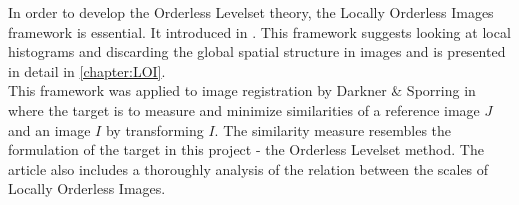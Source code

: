 In order to develop the Orderless Levelset theory, the Locally Orderless Images framework is essential. It introduced in \cite{griffin.97, koe.99}. This framework suggests looking at local histograms and discarding the global spatial structure in images and is presented in detail in \cref{chapter:LOI}.\\
This framework was applied to image registration by Darkner \& Sporring in \cite{dar.11,dar.12} where the target is to measure and minimize similarities of a reference image $J$ and an image $I$ by transforming $I$. The similarity measure resembles the formulation of the target in this project - the Orderless Levelset method. The article also includes a thoroughly analysis of the relation between the scales of Locally Orderless Images.